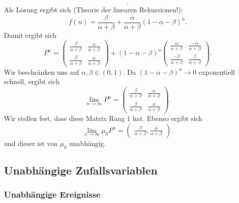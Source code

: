 \begin{example}
\begin{enumerate}[label=\protect\circled{\alph*}]
\[            .\] 
            Als Lösung ergibt sich (Theorie der linearen Rekursionen!):
            \[
                f(n) = \frac{β}{α+β} + \frac{α}{α+β}(1-α-β)^n
            .\] 
            Damit ergibt sich
            \[
                P^n = \begin{pmatrix} \frac{β}{α+β} & \frac{α}{α+β} \\ \frac{β}{α+β} & \frac{α}{α+β} \end{pmatrix}  + (1-α-β)^n \begin{pmatrix} \frac{α}{α+β} & \frac{-α }{\alpha + \beta} \\ \frac{-\beta }{\alpha + \beta} & \frac{\beta}{\alpha + \beta} \end{pmatrix} 
            .\] 
            Wir beschränken uns auf $α,β \in (0,1)$. Da $(1-α-β)^n \to 0$ exponentiell schnell, ergibt sich
            \[
            \lim_{n \to \infty} P^n = \begin{pmatrix} \frac{β}{α+β} & \frac{α}{α+β} \\ \frac{β}{α+β} & \frac{α}{α+β} \end{pmatrix} 
            .\] 
            Wir stellen fest, dass diese Matrix Rang 1 hat. Ebenso ergibt sich
\[
\lim_{n \to \infty} \mu_0 P^n = \begin{pmatrix} \frac{β}{α+β}, \frac{α}{α+β} \end{pmatrix} 
.\] 
und dieser ist von $μ_0$ unabhängig.
    \end{enumerate}
\end{example}
\subsection{Unabhängige Zufallsvariablen}
\subsubsection{Unabhängige Ereignisse}

